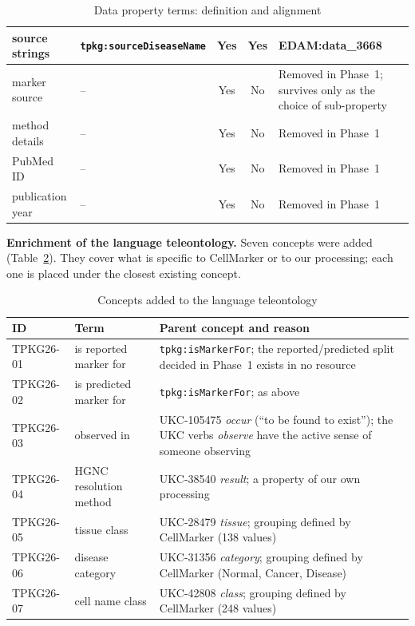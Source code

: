 \begin{table}[htbp]
\begin{tabularx}{\linewidth}{|l|l|c|c|X|}
source strings & \texttt{tpkg:sourceDiseaseName} & Yes & Yes & EDAM:data\_3668 \\ \hline
marker source & -- & Yes & No & Removed in Phase~1; survives only as the choice of sub-property \\ \hline
method details & -- & Yes & No & Removed in Phase~1 \\ \hline
PubMed ID & -- & Yes & No & Removed in Phase~1 \\ \hline
publication year & -- & Yes & No & Removed in Phase~1 \\ \hline
\end{tabularx}
\caption{Data property terms: definition and alignment}
\label{tab:eval-dprops}
\end{table}

\noindent\textbf{Enrichment of the language teleontology.} Seven concepts were added (Table~\ref{tab:enrichment}). They cover what is specific to CellMarker or to our processing; each one is placed under the closest existing concept.

\begin{table}[htbp]
\centering
\footnotesize
\begin{tabularx}{\linewidth}{|l|l|X|}
\hline
\textbf{ID} & \textbf{Term} & \textbf{Parent concept and reason} \\ \hline
TPKG26-01 & is reported marker for & \texttt{tpkg:isMarkerFor}; the reported/predicted split decided in Phase~1 exists in no resource \\ \hline
TPKG26-02 & is predicted marker for & \texttt{tpkg:isMarkerFor}; as above \\ \hline
TPKG26-03 & observed in & UKC-105475 \emph{occur} (``to be found to exist''); the UKC verbs \emph{observe} have the active sense of someone observing \\ \hline
TPKG26-04 & HGNC resolution method & UKC-38540 \emph{result}; a property of our own processing \\ \hline
TPKG26-05 & tissue class & UKC-28479 \emph{tissue}; grouping defined by CellMarker (138 values) \\ \hline
TPKG26-06 & disease category & UKC-31356 \emph{category}; grouping defined by CellMarker (Normal, Cancer, Disease) \\ \hline
TPKG26-07 & cell name class & UKC-42808 \emph{class}; grouping defined by CellMarker (248 values) \\ \hline
\end{tabularx}
\caption{Concepts added to the language teleontology}
\label{tab:enrichment}
\end{table}


